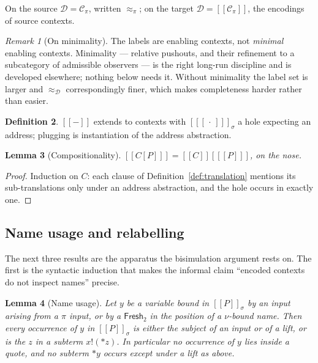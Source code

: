 \documentclass[11pt]{article}
\theoremstyle{definition}
\newtheorem{definition}{Definition}[section]
\theoremstyle{plain}
\newtheorem{lemma}[definition]{Lemma}
\theoremstyle{remark}
\newtheorem{remark}[definition]{Remark}
\newcommand{\drp}[1]{{*}#1}
\newcommand{\out}[2]{#1!(#2)}
\newcommand{\enc}[1]{[\![#1]\!]}
\newcommand{\Frsh}{\mathsf{Fresh}_2}
\newcommand{\Ctx}{\mathscr{C}}
\newcommand{\Obs}{\mathcal{D}}
\newcommand{\bisim}{\approx}
\begin{document}
On the source $\Obs = \Ctx_\pi$, written $\bisim_\pi$; on the target
$\Obs = \enc{\Ctx_\pi}$, the encodings of source contexts.

\begin{remark}[On minimality]
The labels are enabling contexts, not \emph{minimal} enabling contexts.
Minimality --- relative pushouts, and their refinement to a subcategory
of admissible observers --- is the right long-run discipline and is
developed elsewhere; nothing below needs it. Without minimality the
label set is larger and $\bisim_\Obs$ correspondingly finer, which makes
completeness harder rather than easier.
\end{remark}

\begin{definition}
$\enc{-}$ extends to contexts with $\enc{[\,\cdot\,]}_\sigma$ a hole
expecting an address; plugging is instantiation of the address
abstraction.
\end{definition}

\begin{lemma}[Compositionality]\label{lem:compositional}
$\enc{C[P]} = \enc{C}[\enc{P}]$, on the nose.
\end{lemma}

\begin{proof}
Induction on $C$: each clause of Definition~\ref{def:translation}
mentions its sub-translations only under an address abstraction, and the
hole occurs in exactly one.
\end{proof}

\subsection{Name usage and relabelling}

The next three results are the apparatus the bisimulation argument rests
on. The first is the syntactic induction that makes the informal claim
``encoded contexts do not inspect names'' precise.

\begin{lemma}[Name usage]\label{lem:usage}
Let $y$ be a variable bound in $\enc{P}_\sigma$ by an input arising from
a $\pi$ input, or by a $\Frsh$ in the position of a $\nu$-bound name.
Then every occurrence of $y$ in $\enc{P}_\sigma$ is either the subject of
an input or of a lift, or is the $z$ in a subterm $\out{x}{\drp{z}}$. In
particular no occurrence of $y$ lies inside a quote, and no subterm
$\drp{y}$ occurs except under a lift as above.
\end{lemma}
\end{document}
